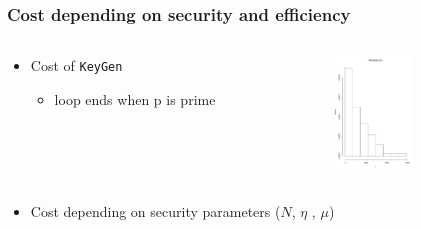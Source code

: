 \documentclass{beamer}
\begin{document}
\begin{frame} \frametitle{Cost depending on security and efficiency}

  \begin{columns}
    \begin{column}[c]{7cm}
      \begin{itemize}
      \item Cost of \texttt{KeyGen}
        \begin{itemize}
        \item loop ends when p is prime
        \end{itemize}
        \vspace{1cm}
      \end{itemize}
    \end{column}
    \begin{column}[c]{5cm}
      \begin{figure}[!h] %
        \vspace{-1cm}
        \centering
        \includegraphics[width=3cm, height=3cm]{f3.pdf} 
        \label{fig:image_f2} %
      \end{figure}
    \end{column}
  \end{columns} 

  \begin{itemize}
  \item Cost depending on security parameters ($N$, $\eta$ , $\mu$)
  \end{itemize}


\end{frame}
\end{document}
